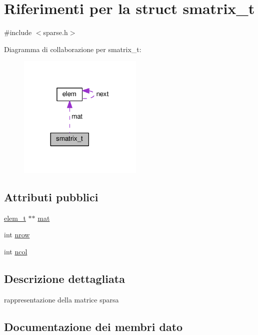 \hypertarget{structsmatrix__t}{}\section{Riferimenti per la struct smatrix\+\_\+t}
\label{structsmatrix__t}


{\ttfamily \#include $<$sparse.\+h$>$}



Diagramma di collaborazione per smatrix\+\_\+t\+:\nopagebreak
\begin{figure}[H]
\begin{center}
\leavevmode
\includegraphics[width=168pt]{structsmatrix__t__coll__graph}
\end{center}
\end{figure}
\subsection*{Attributi pubblici}
\begin{DoxyCompactItemize}
\item 
\hyperlink{structelem}{elem\+\_\+t} $\ast$$\ast$ \hyperlink{structsmatrix__t_aa60ccb45be474ec81f6daab4fcdab2c4}{mat}
\item 
int \hyperlink{structsmatrix__t_ae0b8f31ddab7ed23ca14a46758291f37}{nrow}
\item 
int \hyperlink{structsmatrix__t_a7a7218430298fc18a42dfa43ecc41635}{ncol}
\end{DoxyCompactItemize}


\subsection{Descrizione dettagliata}
rappresentazione della matrice sparsa 

\subsection{Documentazione dei membri dato}
